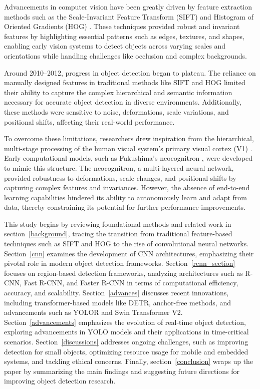 \documentclass[3p,times]{elsarticle}
\begin{document}
Advancements in computer vision have been greatly driven by feature extraction methods such as the Scale-Invariant Feature Transform (SIFT) \citet{Lowe2004} and Histogram of Oriented Gradients (HOG) \citet{Dalal2005}. These techniques provided robust and invariant features by highlighting essential patterns such as edges, textures, and shapes, enabling early vision systems to detect objects across varying scales and orientations while handling challenges like occlusion and complex backgrounds.

Around 2010–2012, progress in object detection began to plateau. The reliance on manually designed features in traditional methods like SIFT and HOG limited their ability to capture the complex hierarchical and semantic information necessary for accurate object detection in diverse environments. Additionally, these methods were sensitive to noise, deformations, scale variations, and positional shifts, affecting their real-world performance.

To overcome these limitations, researchers drew inspiration from the hierarchical, multi-stage processing of the human visual system's primary visual cortex (V1) \citet{Hubel1968}. Early computational models, such as Fukushima's neocognitron \citet{fukushima:neocognitronbc}, were developed to mimic this structure. The neocognitron, a multi-layered neural network, provided robustness to deformations, scale changes, and positional shifts by capturing complex features and invariances. However, the absence of end-to-end learning capabilities hindered its ability to autonomously learn and adapt from data, thereby constraining its potential for further performance improvements.

This study begins by reviewing foundational methods and related work in section~\ref{background}, tracing the transition from traditional feature-based techniques such as SIFT and HOG to the rise of convolutional neural networks. Section~\ref{cnn} examines the development of CNN architectures, emphasizing their pivotal role in modern object detection frameworks. Section~\ref{rcnn_section} focuses on region-based detection frameworks, analyzing architectures such as R-CNN, Fast R-CNN, and Faster R-CNN in terms of computational efficiency, accuracy, and scalability. Section~\ref{advances} discusses recent innovations, including transformer-based models like DETR, anchor-free methods, and advancements such as YOLOR and Swin Transformer V2. Section~\ref{advancements} emphasizes the evolution of real-time object detection, exploring advancements in YOLO models and their applications in time-critical scenarios. Section~\ref{discussions} addresses ongoing challenges, such as improving detection for small objects, optimizing resource usage for mobile and embedded systems, and tackling ethical concerns. Finally, section~\ref{conclusion} wraps up the paper by summarizing the main findings and suggesting future directions for improving object detection research.
\end{document}
